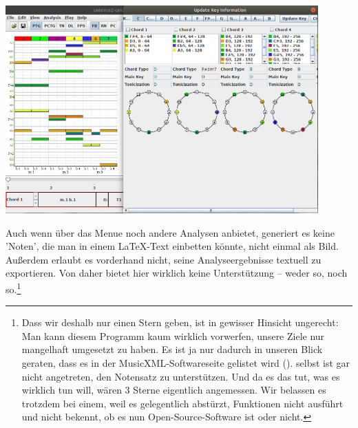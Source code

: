 \begin{center}
\includegraphics[width=0.9\textwidth]{frontends/ptolemaic/ptolemaic-2-win-300dpi.png}
\end{center}

Auch wenn  über das Menue noch andere Analysen anbietet,
generiert es keine 'Noten', die man in einem \LaTeX-Text einbetten könnte, nicht
einmal als Bild. Außerdem erlaubt es vorderhand nicht, seine Analyseergebnisse
textuell zu exportieren. Von daher bietet  hier wirklich keine
Unterstützung -- weder so, noch so.\footnote{Dass wir  deshalb
nur einen Stern geben, ist in gewisser Hinsicht ungerecht: Man kann diesem
Programm kaum wirklich vorwerfen, unsere Ziele nur mangelhaft umgesetzt zu
haben. Es ist ja nur dadurch in unseren Blick geraten, dass es in der
MusicXML-Softwareseite gelistet wird (\cite[vgl.][\nopage
wp]{MusicXML2018b}).  selbst ist gar nicht angetreten, den
Notensatz zu unterstützen. Und da es das tut, was es wirklich tun will, wären 3
Sterne eigentlich angemessen. Wir belassen es trotzdem bei einem, weil es
gelegentlich abstürzt, Funktionen nicht ausführt und nicht bekennt, ob es nun
Open-Source-Software ist oder nicht.}

%
